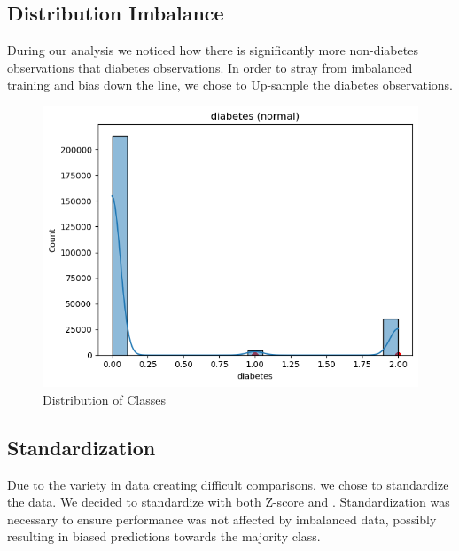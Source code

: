 \documentclass[conference]{IEEEtran}
\begin{document}
\subsection{Distribution Imbalance}
During our analysis we noticed how there is significantly more non-diabetes observations that diabetes observations. In order to stray from imbalanced training and bias down the line, we chose to Up-sample the diabetes observations.

    \begin{figure}[h]
        \centering
        \includegraphics[scale=0.39]{diabetes.png}
        \caption{Distribution of Classes}
        \label{fig:diabetes distribution}
    \end{figure}

\subsection{Standardization}
Due to the variety in data creating difficult comparisons, we chose to standardize the data. We decided to standardize with both Z-score and . Standardization was necessary to ensure performance was not affected by imbalanced data, possibly resulting in biased predictions towards the majority class.
\end{document}
